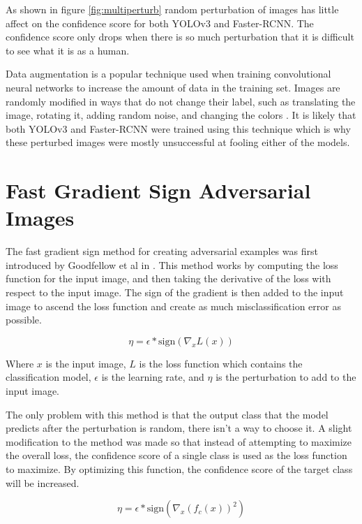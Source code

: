 \documentclass{article}
\begin{document}
As shown in figure \ref{fig:multiperturb} random perturbation of images has little affect on the confidence score for both YOLOv3 and Faster-RCNN. The confidence score only drops when there is so much perturbation that it is difficult to see what it is as a human.

Data augmentation is a popular technique used when training convolutional neural networks to increase the amount of data in the training set. Images are randomly modified in ways that do not change their label, such as translating the image, rotating it, adding random noise, and changing the colors \cite{shorten2019survey}. It is likely that both YOLOv3 and Faster-RCNN were trained using this technique which is why these perturbed images were mostly unsuccessful at fooling either of the models.

\section{Fast Gradient Sign Adversarial Images}

The fast gradient sign method for creating adversarial examples was first introduced by Goodfellow et al in \cite{goodfellow2015explaining}. This method works by computing the loss function for the input image, and then taking the derivative of the loss with respect to the input image. The sign of the gradient is then added to the input image to ascend the loss function and create as much misclassification error as possible.

\begin{equation}
    \eta = \epsilon * \text{sign} (\nabla_x L(x))
\end{equation}

Where $x$ is the input image, $L$ is the loss function which contains the classification model, $\epsilon$ is the learning rate, and $\eta$ is the perturbation to add to the input image.

The only problem with this method is that the output class that the model predicts after the perturbation is random, there isn't a way to choose it. A slight modification to the method was made so that instead of attempting to maximize the overall loss, the confidence score of a single class is used as the loss function to maximize. By optimizing this function, the confidence score of the target class will be increased.

\begin{equation}
    \eta = \epsilon * \text{sign} (\nabla_x (f_c(x))^2)
\end{equation}
\end{document}
